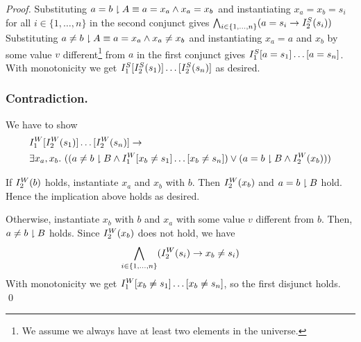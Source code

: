 \begin{techreport}
\begin{proof}
Substituting $a=b\proj A \equiv a=x_a\land x_a=x_b$ and instantiating
$x_a=x_b=s_i$ for all $i\in\{1,\dots,n\}$ in the second conjunct gives
$\bigwedge_{i\in\{1,\dots,n\}} (a=s_i \rightarrow I_2\S(s_i))$
%
Substituting $a\neq b\proj A \equiv a=x_a\land x_a \neq x_b$ and instantiating $x_a=a$
and $x_b$ by some value $v$ different\footnote{We assume we always have at least
  two elements in the universe.} from $a$ in the first conjunct gives
$I_1\S[a=s_1]\dots[a=s_n]$.  
%
With monotonicity we get
$I_1\S[I_2\S(s_1)]\dots[I_2\S(s_n)]$ as desired.


\subsubsection*{Contradiction.}
We have to show
\begin{align*}
&I_1\W[I_2\W(s_1)]\dots[I_2\W(s_n)] \rightarrow \\
&\exists x_a,x_b.~((a\neq b \proj B \land I_1\W[x_b\neq s_1]\dots[x_b\neq s_n])
\lor (a= b \proj B \land I_2\W(x_b)))
\end{align*}

If $I_2\W(b)$ holds, instantiate $x_a$ and $x_b$ with $b$.  Then $I_2\W(x_b)$ 
and $a = b\proj B$ hold.  Hence the implication above holds
as desired.

Otherwise, instantiate $x_b$ with $b$ and $x_a$ with some value $v$ different
from $b$.  Then, $a\neq b \proj B$ holds. Since $I_2\W(x_b)$ does not
hold, we have 
\[\bigwedge_{i\in\{1,\dots,n\}} (I_2\W(s_i) \rightarrow x_b \neq s_i)\]
With monotonicity we get 
$I_1\W[x_b\neq s_1]\dots[x_b\neq s_n]$, so the first disjunct holds.
\qed
\fi
\end{proof}
\end{techreport}


